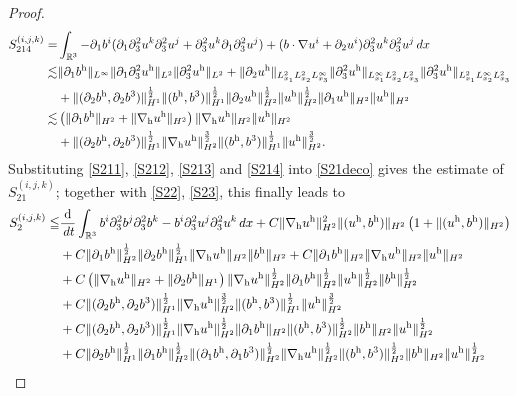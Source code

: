 \documentclass[10pt,a4paper]{amsart}
\newcommand{\R}{\mathbb{R}}
\newcommand{\dt}{\,{\rm d}t}
\newcommand{\dx}{\,{\rm d}x}
\newcommand{\h}{\mathrm{h}}
\newcommand{\nablah}{\nabla_{\mathrm{h}}}
\begin{document}
\begin{proof}
	\begin{align}\label{S214}
		S^{(i,j,k)}_{214}=&\int_{\R^3}-\partial_1b^i(\partial_1\partial_3^2u^k\partial_3^2u^j+\partial_3^2u^k\partial_1\partial_3^2u^j)+(b\cdot\nabla u^i+\partial_2u^i)\partial_3^2u^k\partial_3^2u^j\dx\nonumber\\
		\lesssim&\|\partial_1b^\h\|_{L^\infty}\|\partial_1\partial_3^2u^\h\|_{L^2}\|\partial_3^2u^\h\|_{L^2}+\|\partial_2u^\h\|_{L^2_{x_1}L^2_{x_2}L^\infty_{x_3}}\|\partial_3^2u^\h\|_{L^\infty_{x_1}L^2_{x_2}L^2_{x_3}}\|\partial_3^2u^\h\|_{L^2_{x_1}L^\infty_{x_2}L^2_{x_3}}\nonumber\\
		&+\|(\partial_2b^\h,\partial_2b^3)\|_{H^1}^\frac12\|(b^\h,b^3)\|_{H^1}^\frac12\|\partial_2u^\h\|_{H^2}^\frac12\|u^\h\|_{H^2}^\frac12\|\partial_1u^\h\|_{H^2}\|u^\h\|_{H^2}\nonumber\\
		\lesssim&\left(\|\partial_1b^\h\|_{H^2}+\|\nablah u^\h\|_{H^2}\right)\|\nablah u^\h\|_{H^2}\|u^\h\|_{H^2}\nonumber\\
		&+\|(\partial_2b^\h,\partial_2b^3)\|_{H^1}^\frac12\|\nablah u^\h\|_{H^2}^\frac32\|(b^\h,b^3)\|_{H^1}^\frac12\|u^\h\|_{H^2}^\frac32.
	\end{align}
	Substituting \eqref{S211}, \eqref{S212}, \eqref{S213} and \eqref{S214} into \eqref{S21deco} gives the estimate of $S^{(i,j,k)}_{21}$; together with \eqref{S22}, \eqref{S23}, this finally leads to
	\begin{align*}
		S^{(i,j,k)}_{2}\leqq&\frac{\mathrm{d}}{\dt}\int_{\R^3} b^i\partial_3^2b^j\partial_3^2b^k-b^i\partial_3^2u^j\partial_3^2u^k\dx+C\|\nablah u^\h\|_{H^2}^2\|(u^\h,b^\h)\|_{H^2}\left(1+\|(u^\h,b^\h)\|_{H^2}\right)\nonumber\\
		&+C\|\partial_1b^\h\|_{H^2}^\frac12\|\partial_2b^\h\|_{H^1}^\frac12\|\nablah u^\h\|_{H^2}\|b^\h\|_{H^2}+C\|\partial_1b^\h\|_{H^2}\|\nablah u^\h\|_{H^2}\|u^\h\|_{H^2}\nonumber\\
		&+C\left(\|\nablah u^\h\|_{H^2}+\|\partial_2b^\h\|_{H^1}\right)\|\nablah u^\h\|_{H^2}^\frac12\|\partial_1b^\h\|_{H^2}^\frac12\| u^\h\|_{H^2}^\frac12  \| b^\h\|_{H^2}^\frac12\nonumber\\
		&+C\|(\partial_2b^\h,\partial_2b^3)\|_{H^1}^\frac12\|\nablah u^\h\|_{H^2}^\frac32\|(b^\h,b^3)\|_{H^1}^\frac12\|u^\h\|_{H^2}^\frac32\nonumber\\
		&+C\|(\partial_2b^\h,\partial_2b^3)\|_{H^1}^\frac12\|\nablah u^\h\|_{H^2}^\frac12\|\partial_1b^\h\|_{H^2}\|(b^\h,b^3)\|_{H^2}^\frac12\|b^\h\|_{H^2}\|u^\h\|_{H^2}^\frac12\nonumber\\
		&+C\|\partial_2b^\h\|_{H^1}^\frac12\|\partial_1b^\h\|_{H^2}^\frac12\|(\partial_1b^\h,\partial_1b^3)\|_{H^2}^\frac12\|\nablah u^\h\|_{H^2}^\frac12\|(b^\h,b^3)\|_{H^2}^\frac12\|b^\h\|_{H^2}\|u^\h\|_{H^2}^\frac12\nonumber\\

\end{align*}
\end{proof}
\end{document}
